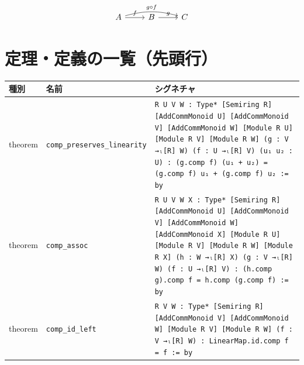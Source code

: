 \documentclass[12pt]{article}
\begin{document}
\[
\begin{tikzcd}
A \arrow[r, "f"] \arrow[rr, bend left=15, "g \circ f"] & B \arrow[r, "g"] & C
\end{tikzcd}
\]


\section*{定理・定義の一覧（先頭行）}
\begin{center}
\begin{tabular}{lll}
\textbf{種別} & \textbf{名前} & \textbf{シグネチャ} \\ \hline
theorem & \texttt{comp\_preserves\_linearity} & \texttt{{R U V W : Type*} [Semiring R] [AddCommMonoid U] [AddCommMonoid V] [AddCommMonoid W] [Module R U] [Module R V] [Module R W] (g : V →ₗ[R] W) (f : U →ₗ[R] V) (u₁ u₂ : U) : (g.comp f) (u₁ + u₂) = (g.comp f) u₁ + (g.comp f) u₂ := by} \\
theorem & \texttt{comp\_assoc} & \texttt{{R U V W X : Type*} [Semiring R] [AddCommMonoid U] [AddCommMonoid V] [AddCommMonoid W] [AddCommMonoid X] [Module R U] [Module R V] [Module R W] [Module R X] (h : W →ₗ[R] X) (g : V →ₗ[R] W) (f : U →ₗ[R] V) : (h.comp g).comp f = h.comp (g.comp f) := by} \\
theorem & \texttt{comp\_id\_left} & \texttt{{R V W : Type*} [Semiring R] [AddCommMonoid V] [AddCommMonoid W] [Module R V] [Module R W] (f : V →ₗ[R] W) : LinearMap.id.comp f = f := by} \\
\end{tabular}
\end{center}
\end{document}
